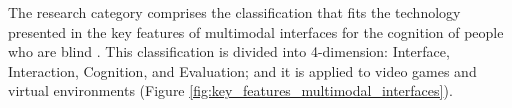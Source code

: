 The research category comprises the classification that fits the technology presented in the key features of multimodal interfaces for the cognition of people who are blind \cite{Darin2015}. This classification is divided into 4-dimension: Interface, Interaction, Cognition, and Evaluation; and it is applied to video games and virtual environments (Figure \ref{fig:key_features_multimodal_interfaces}).

 	\begin{figure}[h] 
   	    \captionsetup{width=14cm}%
	\end{figure}

